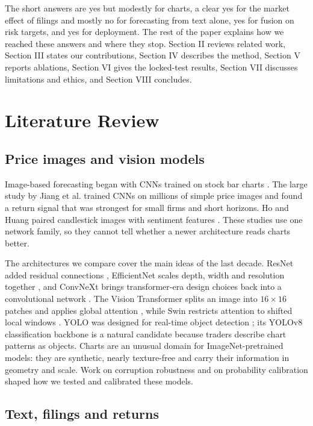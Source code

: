 \documentclass[conference]{IEEEtran}
\begin{document}
The short answers are yes but modestly for charts, a clear yes for the market effect of filings and mostly no for forecasting from text alone, yes for fusion on risk targets, and yes for deployment. The rest of the paper explains how we reached these answers and where they stop. Section II reviews related work, Section III states our contributions, Section IV describes the method, Section V reports ablations, Section VI gives the locked-test results, Section VII discusses limitations and ethics, and Section VIII concludes.

\section{Literature Review}

\subsection{Price images and vision models}

Image-based forecasting began with CNNs trained on stock bar charts \cite{sezer2019}. The large study by Jiang et al. \cite{jkx2023} trained CNNs on millions of simple price images and found a return signal that was strongest for small firms and short horizons. Ho and Huang paired candlestick images with sentiment features \cite{ho2021}. These studies use one network family, so they cannot tell whether a newer architecture reads charts better.

The architectures we compare cover the main ideas of the last decade. ResNet added residual connections \cite{he2016}, EfficientNet scales depth, width and resolution together \cite{tan2019}, and ConvNeXt brings transformer-era design choices back into a convolutional network \cite{liu2022convnext}. The Vision Transformer splits an image into $16\times16$ patches and applies global attention \cite{dosovitskiy2021}, while Swin restricts attention to shifted local windows \cite{liu2021swin}. YOLO was designed for real-time object detection \cite{redmon2016}; its YOLOv8 classification backbone \cite{jocher2023} is a natural candidate because traders describe chart patterns as objects. Charts are an unusual domain for ImageNet-pretrained models: they are synthetic, nearly texture-free and carry their information in geometry and scale. Work on corruption robustness \cite{hendrycks2019} and on probability calibration \cite{guo2017} shaped how we tested and calibrated these models.

\subsection{Text, filings and returns}
\end{document}
